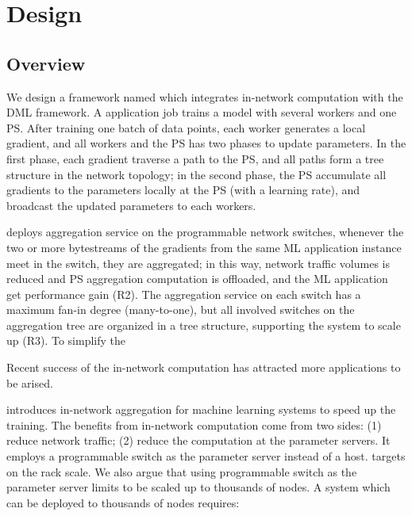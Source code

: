 \section{Design}
\subsection{Overview}
We design a framework named \sysname which integrates in-network computation with the DML framework. A \sysname application job trains a model with several workers and one PS. After training one batch of data points,  each worker generates a local gradient, and all workers and the PS has two phases to update parameters. In the first phase, each gradient traverse a path to the PS, and all paths form a tree structure in the network topology; in the second phase, the PS accumulate all gradients to the parameters locally at the PS (with a learning rate), and broadcast the updated parameters to each workers.

\sysname deploys aggregation service on the programmable network switches, whenever the two or more bytestreams of the gradients from the same ML application instance meet in the switch, they are aggregated; in this way, network traffic volumes is reduced and PS aggregation computation is offloaded, and the ML application get performance gain (R2). The aggregation service on each switch has a maximum fan-in degree (many-to-one), but all involved switches on the aggregation tree are organized in a tree structure, supporting the system to scale up (R3). To simplify the 



Recent success of the in-network computation has attracted more 
applications to be arised.  

\switchml introduces in-network aggregation for machine learning systems
to speed up the training. The benefits from in-network computation 
come from two sides: (1) reduce network traffic; (2) reduce the computation
at the parameter servers. 
It employs a programmable switch as the parameter server instead of a host. 
\switchml targets on the rack scale. We also argue that using programmable switch
as the parameter server limits \switchml to be scaled up to 
thousands of nodes. A system which can be deployed to thousands of nodes requires:


